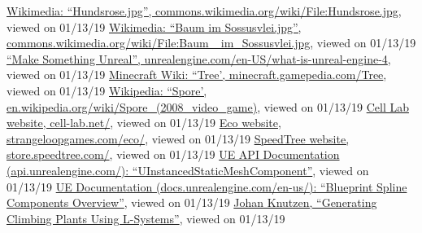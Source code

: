 \documentclass[11pt, abstract=on]{scrartcl}
\begin{document}
\begin{thebibliography}{99}
	  \href{https://commons.wikimedia.org/wiki/File:Hundsrose.jpg}{Wikimedia: ``Hundsrose.jpg'', commons.wikimedia.org/wiki/File:Hundsrose.jpg}, viewed on 01/13/19
	 \href{https://commons.wikimedia.org/wiki/File:Baum_im_Sossusvlei.jpg}
	{Wikimedia: ``Baum im Sossusvlei.jpg'', commons.wikimedia.org/wiki/File:Baum\_ im\_Sossusvlei.jpg}, viewed on 01/13/19
	  \href{https://www.unrealengine.com/en-US/what-is-unreal-engine-4}{``Make Something Unreal'', unrealengine.com/en-US/what-is-unreal-engine-4}, viewed on 01/13/19
	  \href{https://minecraft.gamepedia.com/Tree}{Minecraft Wiki: ``Tree', minecraft.gamepedia.com/Tree}, viewed on 01/13/19
	  \href{https://en.wikipedia.org/wiki/Spore_(2008_video_game)}{Wikipedia: ``Spore', en.wikipedia.org/wiki/Spore\_(2008\_video\_game)}, viewed on 01/13/19
	  \href{http://cell-lab.net/}{Cell Lab website, cell-lab.net/}, viewed on 01/13/19
	  \href{https://www.strangeloopgames.com/eco/}{Eco website, strangeloopgames.com/eco/}, viewed on 01/13/19
	  \href{https://store.speedtree.com/}{SpeedTree website, store.speedtree.com/}, viewed on 01/13/19
	  \href{https://api.unrealengine.com/INT/API/Runtime/Engine/Components/UInstancedStaticMeshComponent/index.html}{UE API Documentation (api.unrealengine.com/): ``UInstancedStaticMeshComponent''}, viewed on 01/13/19
	  \href{https://docs.unrealengine.com/en-us/Engine/BlueprintSplines/Overview}{UE Documentation (docs.unrealengine.com/en-us/): ``Blueprint Spline Components Overview''}, viewed on 01/13/19
	  \href{http://www.cse.chalmers.se/~uffe/xjobb/climbingplants.pdf}{Johan Knutzen, ``Generating Climbing Plants Using L-Systems''}, viewed on 01/13/19
	
\end{thebibliography}
\end{document}
